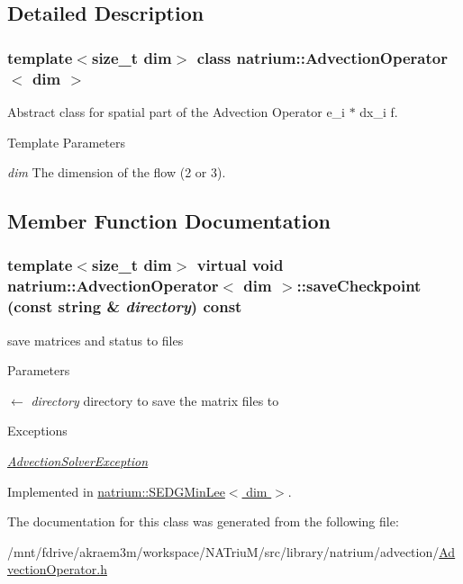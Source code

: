 \subsection{Detailed Description}
\subsubsection*{template$<$size\_\-t dim$>$ class natrium::AdvectionOperator$<$ dim $>$}

Abstract class for spatial part of the Advection Operator e\_\-i $\ast$ dx\_\-i f. 
\begin{DoxyTemplParams}{Template Parameters}
\item[{\em dim}]The dimension of the flow (2 or 3). \end{DoxyTemplParams}


\subsection{Member Function Documentation}
\hypertarget{classnatrium_1_1AdvectionOperator_aca14260bae100874b0050a2a96d7a564}{
\subsubsection[{saveCheckpoint}]{\setlength{\rightskip}{0pt plus 5cm}template$<$size\_\-t dim$>$ virtual void {\bf natrium::AdvectionOperator}$<$ dim $>$::saveCheckpoint (const string \& {\em directory}) const}}
\label{classnatrium_1_1AdvectionOperator_aca14260bae100874b0050a2a96d7a564}


save matrices and status to files 
\begin{DoxyParams}{Parameters}
\item[\mbox{$\leftarrow$} {\em directory}]directory to save the matrix files to \end{DoxyParams}

\begin{DoxyExceptions}{Exceptions}
\item[{\em \hyperlink{classnatrium_1_1AdvectionSolverException}{AdvectionSolverException}}]\end{DoxyExceptions}


Implemented in \hyperlink{classnatrium_1_1SEDGMinLee_ab3cf80e18230ee7f08f4ed9883b9dadd}{natrium::SEDGMinLee$<$ dim $>$}.

The documentation for this class was generated from the following file:\begin{DoxyCompactItemize}
\item 
/mnt/fdrive/akraem3m/workspace/NATriuM/src/library/natrium/advection/\hyperlink{AdvectionOperator_8h}{AdvectionOperator.h}\end{DoxyCompactItemize}
